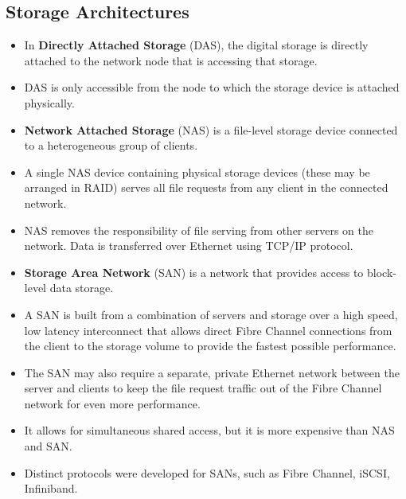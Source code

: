 \documentclass{article}
\begin{document}
\subsection{Storage Architectures}
\begin{itemize}
    \item In \textbf{Directly Attached Storage} (DAS), the digital storage is directly attached to the network node that is accessing that storage. 
    
    \item DAS is only accessible from the node to which the storage device is attached physically. 
    
    \item \textbf{Network Attached Storage} (NAS) is a file-level storage device connected to a heterogeneous group of clients. 
    
    \item A single NAS device containing physical storage devices (these may be arranged in RAID) serves all file requests from any client in the connected network. 
    
    \item NAS removes the responsibility of file serving from other servers on the network. Data is transferred over Ethernet using TCP/IP protocol. 
    
    \item \textbf{Storage Area Network} (SAN) is a network that provides access to block-level data storage. 
    
    \item  A SAN is built from a combination of servers and storage over a high speed, low latency interconnect that allows direct Fibre Channel connections from the client to the storage volume to provide the fastest possible performance.
    
    \item The SAN may also require a separate, private Ethernet network between the server and clients to keep the file request traffic out of the Fibre Channel network for even more performance. 
    
    \item It allows for simultaneous shared access, but it is more expensive than NAS and SAN. 
    
    \item  Distinct protocols were developed for SANs, such as Fibre Channel, iSCSI, Infiniband. 
\end{itemize}
\end{document}
